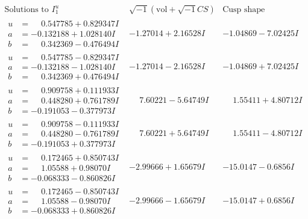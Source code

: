 \documentclass[1p]{elsarticle_modified}
\theoremstyle{definition}
\newcommand{\I}{\sqrt{-1}}
\begin{document}
$$\begin{array}{c|c|c}  
\text{Solutions to }I^u_{1}& \I (\text{vol} + \sqrt{-1}CS) & \text{Cusp shape}\\
 \hline 
\begin{aligned}
u &= \phantom{-}0.547785 + 0.829347 I \\
a &= -0.132188 + 1.028140 I \\
b &= \phantom{-}0.342369 - 0.476494 I\end{aligned}
 & -1.27014 + 2.16528 I & -1.04869 - 7.02425 I \\ \hline\begin{aligned}
u &= \phantom{-}0.547785 - 0.829347 I \\
a &= -0.132188 - 1.028140 I \\
b &= \phantom{-}0.342369 + 0.476494 I\end{aligned}
 & -1.27014 - 2.16528 I & -1.04869 + 7.02425 I \\ \hline\begin{aligned}
u &= \phantom{-}0.909758 + 0.111933 I \\
a &= \phantom{-}0.448280 + 0.761789 I \\
b &= -0.191053 - 0.377973 I\end{aligned}
 & \phantom{-}7.60221 - 5.64749 I & \phantom{-}1.55411 + 4.80712 I \\ \hline\begin{aligned}
u &= \phantom{-}0.909758 - 0.111933 I \\
a &= \phantom{-}0.448280 - 0.761789 I \\
b &= -0.191053 + 0.377973 I\end{aligned}
 & \phantom{-}7.60221 + 5.64749 I & \phantom{-}1.55411 - 4.80712 I \\ \hline\begin{aligned}
u &= \phantom{-}0.172465 + 0.850743 I \\
a &= \phantom{-}1.05588 + 0.98070 I \\
b &= -0.068333 - 0.860826 I\end{aligned}
 & -2.99666 + 1.65679 I & -15.0147 - 0.6856 I \\ \hline\begin{aligned}
u &= \phantom{-}0.172465 - 0.850743 I \\
a &= \phantom{-}1.05588 - 0.98070 I \\
b &= -0.068333 + 0.860826 I\end{aligned}
 & -2.99666 - 1.65679 I & -15.0147 + 0.6856 I \\ \hline\begin{aligned}

\end{aligned}
\end{array}$$
\end{document}
